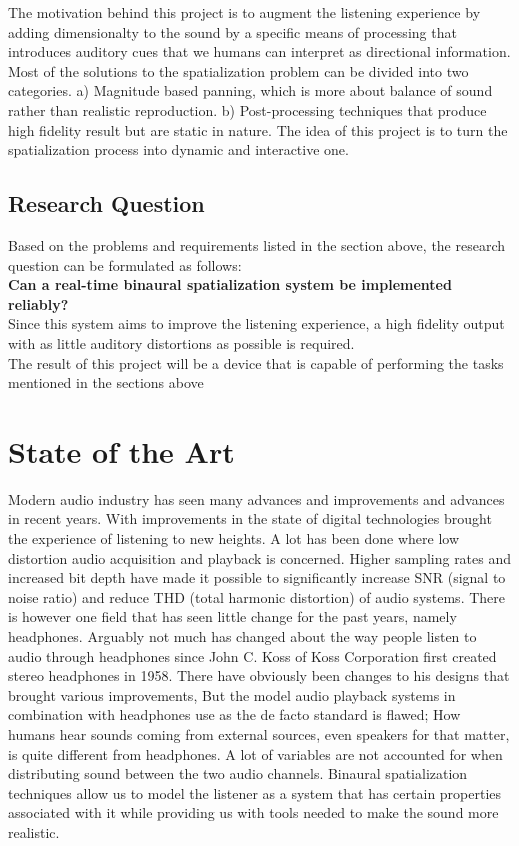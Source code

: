 \documentclass[a4paper,12pt,oneside]{article}
\begin{document}
The motivation behind this project is to augment the listening experience by adding dimensionalty to the sound by a specific means of processing that introduces auditory cues that we humans can interpret as directional information. Most of the solutions to the spatialization problem can be divided into two categories. a) Magnitude based panning, which is more about balance of sound rather than realistic reproduction. b) Post-processing techniques that produce high fidelity result but are static in nature. The idea of this project is to turn the spatialization process into dynamic and interactive one.

\subsection{Research Question}


Based on the problems and requirements listed in the section above, the research question can be formulated as follows:\\
\textbf{Can a real-time binaural spatialization system be implemented reliably?}\\
Since this system aims to improve the listening experience, a high fidelity output with as little auditory distortions as possible is required.\\
The result of this project will be a device that is capable of performing the tasks mentioned in the sections above

\section{State of the Art}
Modern audio industry has seen many advances and improvements and advances in recent years. With improvements in the state of digital technologies brought the experience of listening to new heights. A lot has been done where low distortion audio acquisition and playback is concerned. Higher sampling rates and increased bit depth have made it possible to significantly increase SNR (signal to noise ratio) and reduce THD (total harmonic distortion) of audio systems. There is however one field that has seen little change for the past years, namely headphones. Arguably not much has changed about the way people listen to audio through headphones since John C. Koss of Koss Corporation first created stereo headphones in 1958. There have obviously been changes to his designs that brought various improvements, But the model audio playback systems in combination with headphones use as the de facto standard is flawed; How humans hear sounds coming from external sources, even speakers for that matter, is quite different from headphones. A lot of variables are not accounted for when distributing sound between the two audio channels. Binaural spatialization techniques allow us to model the listener as a system that has certain properties associated with it while providing us with tools needed to make the sound more realistic.\\
\end{document}
